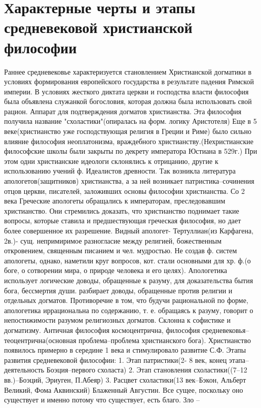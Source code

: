 \documentclass[12pt]{article}
\begin{document}
\newpage
\section{Характерные черты и этапы средневековой христианской философии}
Раннее средневековье характеризуется становлением Христианской догматики в условиях формирования
европейского государства в результате падения Римской империи. В условиях жесткого диктата церкви и
господства власти философия была объявлена служанкой богословия, которая должна была использовать свой
рацион. Аппарат для подтверждения догматов христианства. Эта философия получила название
"схоластики"(опиралась на форм. логику Аристотеля)
Еще в 5 веке(христианство уже господствующая религия в Греции и Риме) было сильно влияние философия
неоплатонизма, враждебного христианству.(Нехристианские философские школы были закрыты по декрету
императора Юстиана в 529г.) При этом одни христианские идеологи склонялись к отрицанию, другие к 
использованию учений ф. Идеалистов древности. Так возникла литература апологетов(защитников)
христианства, а за ней возникает патристика–сочинения отцов церкви, писателей, заложивших основы
философии христианства.
Со 2 века Греческие апологеты обращались к императорам, преследовавшим христианство. Они стремились
доказать, что христианство поднимает такие вопросы, которые ставила и предшествующая греческая
философия, но дает более совершенное их разрешение. Видный апологет- Тертуллиан(из Карфагена, 2в.)- сущ.
непримиримое разногласие между религией, божественным откровением, священным писанием и чел.
мудростью. Не создав ф. систем апологеты, однако, наметили круг вопросов, кот. стали основными для хр. ф.(о
боге, о сотворении мира, о природе человека и его целях). Апологетика использует логические доводы,
обращенные к разуму, для доказательства бытия бога, бессмертия души. разбирает доводы, обращенные против
религии и отдельных догматов. Противоречие в том, что будучи рациональной по форме, апологетика
иррациональна по содержанию, т. е. обращаясь к разуму, говорит о непостижимости разумом религиозных
догматов.
Склонна к софистике и догматизму.
Античная философия космоцентрична, философия средневековья–теоцентрична(основная проблема–проблема
христианского бога). Христианство появилось примерно в середине 1 века и стимулировало развитие С.Ф.
Этапы развития средневековой философии:
1. Этап патристики(2- 8 век, конец этапа–деятельность Боэция–первого схоласта)
2. Этап становления схоластики((7–12 вв.)–Боэций, Эриуген, П.Абеяр)
3. Расцвет схоластики(13 век–Бэкон, Альберт Великий, Фома Аквинский)
Блаженный Августин. Все сущее, поскольку оно существует и именно потому что существует, есть благо. Зло –
\end{document}
